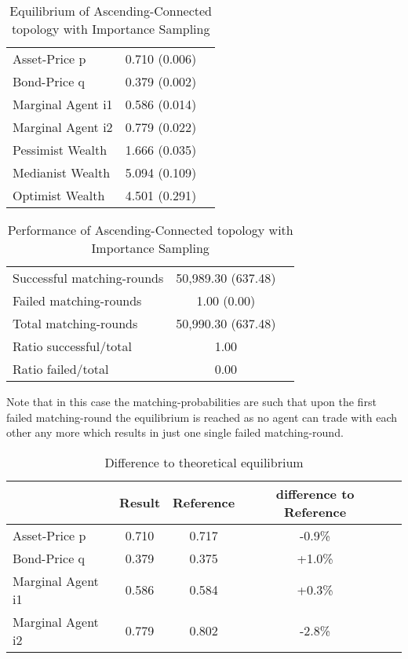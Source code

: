 \documentclass[Bachelorarbeit.tex]{subfiles}
\begin{document}
\begin{table}[H]
	\caption{Equilibrium of Ascending-Connected topology with Importance Sampling}
	\centering
	\begin{tabular} { l c r }
		\hline
		Asset-Price p & 0.710 (0.006) \\
		Bond-Price q & 0.379 (0.002) \\
		Marginal Agent i1 & 0.586 (0.014) \\
		Marginal Agent i2 & 0.779 (0.022) \\
		\hline
		Pessimist Wealth & 1.666 (0.035) \\
		Medianist Wealth & 5.094 (0.109) \\
		Optimist Wealth & 4.501 (0.291) \\
		\hline
	\end{tabular}
\end{table} 

\begin{table}[H]
	\caption{Performance of Ascending-Connected topology with Importance Sampling}
	\centering
	\begin{tabular} { l c r }
		\hline
		Successful matching-rounds & 50,989.30 (637.48) \\
		Failed matching-rounds & 1.00 (0.00) \\
		Total matching-rounds & 50,990.30 (637.48) \\
		\hline
		Ratio successful/total & 1.00 \\
		Ratio failed/total & 0.00 \\
		\hline
	\end{tabular}
\end{table}

Note that in this case the matching-probabilities are such that upon the first failed matching-round the equilibrium is reached as no agent can trade with each other any more which results in just one single failed matching-round.

\begin{table}[H]
	\caption{Difference to theoretical equilibrium}
	\centering
	\begin{tabular} { l c c c r }
		& Result & Reference & difference to Reference \\
		\hline
		Asset-Price p & 0.710 & 0.717 & -0.9\% \\
		Bond-Price q & 0.379 & 0.375 & +1.0\% \\
		Marginal Agent i1 & 0.586 & 0.584 & +0.3\% \\
		Marginal Agent i2 & 0.779 & 0.802 & -2.8\% \\
		\hline
	\end{tabular}
\end{table}
\end{document}
